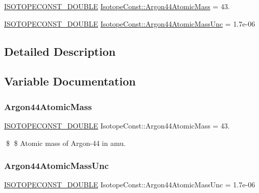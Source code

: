 \begin{DoxyCompactItemize}
\item 
\mbox{\hyperlink{group___isotope_const-_macros_ga8f45a7272ce02c0b4c65c44636ed719a}{I\+S\+O\+T\+O\+P\+E\+C\+O\+N\+S\+T\+\_\+\+D\+O\+U\+B\+LE}} \mbox{\hyperlink{group___isotope_const-_argon-_ar44_ga2efeccdefb24274f2296d0cb94e392d2}{Isotope\+Const\+::\+Argon44\+Atomic\+Mass}} = 43.
\item 
\mbox{\hyperlink{group___isotope_const-_macros_ga8f45a7272ce02c0b4c65c44636ed719a}{I\+S\+O\+T\+O\+P\+E\+C\+O\+N\+S\+T\+\_\+\+D\+O\+U\+B\+LE}} \mbox{\hyperlink{group___isotope_const-_argon-_ar44_gaace8276bc80c587be347017dd63f098f}{Isotope\+Const\+::\+Argon44\+Atomic\+Mass\+Unc}} = 1.\+7e-\/06
\end{DoxyCompactItemize}


\subsection{Detailed Description}


\subsection{Variable Documentation}
\mbox{\label{group___isotope_const-_argon-_ar44_ga2efeccdefb24274f2296d0cb94e392d2}} 
\subsubsection{\texorpdfstring{Argon44\+Atomic\+Mass}{Argon44AtomicMass}}
{\footnotesize\ttfamily \mbox{\hyperlink{group___isotope_const-_macros_ga8f45a7272ce02c0b4c65c44636ed719a}{I\+S\+O\+T\+O\+P\+E\+C\+O\+N\+S\+T\+\_\+\+D\+O\+U\+B\+LE}} Isotope\+Const\+::\+Argon44\+Atomic\+Mass = 43.}

\$ \$ Atomic mass of Argon-\/44 in amu. \mbox{\label{group___isotope_const-_argon-_ar44_gaace8276bc80c587be347017dd63f098f}} 
\subsubsection{\texorpdfstring{Argon44\+Atomic\+Mass\+Unc}{Argon44AtomicMassUnc}}
{\footnotesize\ttfamily \mbox{\hyperlink{group___isotope_const-_macros_ga8f45a7272ce02c0b4c65c44636ed719a}{I\+S\+O\+T\+O\+P\+E\+C\+O\+N\+S\+T\+\_\+\+D\+O\+U\+B\+LE}} Isotope\+Const\+::\+Argon44\+Atomic\+Mass\+Unc = 1.\+7e-\/06}

